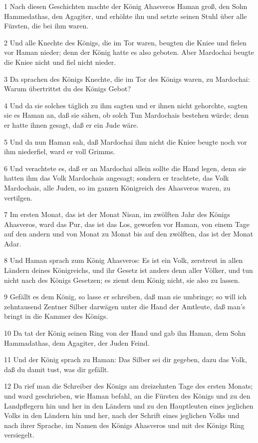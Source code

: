 \par 1 Nach diesen Geschichten machte der König Ahasveros Haman groß, den Sohn Hammedathas, den Agagiter, und erhöhte ihn und setzte seinen Stuhl über alle Fürsten, die bei ihm waren.
\par 2 Und alle Knechte des Königs, die im Tor waren, beugten die Kniee und fielen vor Haman nieder; denn der König hatte es also geboten. Aber Mardochai beugte die Kniee nicht und fiel nicht nieder.
\par 3 Da sprachen des Königs Knechte, die im Tor des Königs waren, zu Mardochai: Warum übertrittst du des Königs Gebot?
\par 4 Und da sie solches täglich zu ihm sagten und er ihnen nicht gehorchte, sagten sie es Haman an, daß sie sähen, ob solch Tun Mardochais bestehen würde; denn er hatte ihnen gesagt, daß er ein Jude wäre.
\par 5 Und da nun Haman sah, daß Mardochai ihm nicht die Kniee beugte noch vor ihm niederfiel, ward er voll Grimms.
\par 6 Und verachtete es, daß er an Mardochai allein sollte die Hand legen, denn sie hatten ihm das Volk Mardochais angesagt; sondern er trachtete, das Volk Mardochais, alle Juden, so im ganzen Königreich des Ahasveros waren, zu vertilgen.
\par 7 Im ersten Monat, das ist der Monat Nisan, im zwölften Jahr des Königs Ahasveros, ward das Pur, das ist das Los, geworfen vor Haman, von einem Tage auf den andern und von Monat zu Monat bis auf den zwölften, das ist der Monat Adar.
\par 8 Und Haman sprach zum König Ahasveros: Es ist ein Volk, zerstreut in allen Ländern deines Königreichs, und ihr Gesetz ist anders denn aller Völker, und tun nicht nach des Königs Gesetzen; es ziemt dem König nicht, sie also zu lassen.
\par 9 Gefällt es dem König, so lasse er schreiben, daß man sie umbringe; so will ich zehntausend Zentner Silber darwägen unter die Hand der Amtleute, daß man's bringt in die Kammer des Königs.
\par 10 Da tat der König seinen Ring von der Hand und gab ihn Haman, dem Sohn Hammadathas, dem Agagiter, der Juden Feind.
\par 11 Und der König sprach zu Haman: Das Silber sei dir gegeben, dazu das Volk, daß du damit tust, was dir gefällt.
\par 12 Da rief man die Schreiber des Königs am dreizehnten Tage des ersten Monats; und ward geschrieben, wie Haman befahl, an die Fürsten des Königs und zu den Landpflegern hin und her in den Ländern und zu den Hauptleuten eines jeglichen Volks in den Ländern hin und her, nach der Schrift eines jeglichen Volks und nach ihrer Sprache, im Namen des Königs Ahasveros und mit des Königs Ring versiegelt.
